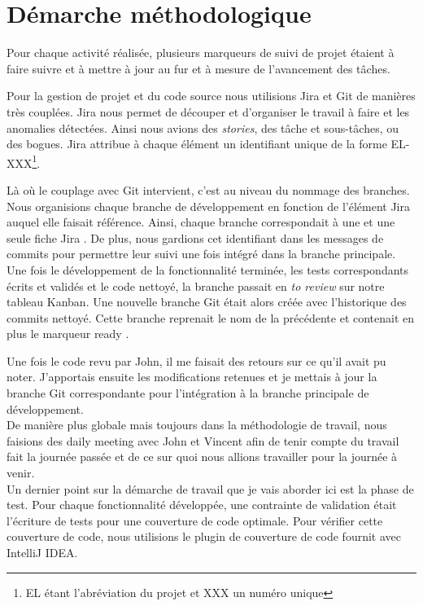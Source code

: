 \section{Démarche méthodologique}
\label{methodo}
Pour chaque activité réalisée, plusieurs marqueurs de suivi de projet étaient à
faire suivre et à mettre à jour au fur et à mesure de l'avancement des tâches.

Pour la gestion de projet et du code source nous utilisions Jira et Git de
manières très couplées. Jira nous permet de découper et d'organiser le travail à
faire et les anomalies détectées. Ainsi nous avions des {\em stories}, des tâche
et sous-tâches, ou des bogues. Jira attribue à chaque élément un identifiant unique
de la forme EL-XXX\footnote{EL étant l'abréviation du projet et XXX un numéro
unique}.

Là où le couplage avec Git intervient, c'est au niveau du nommage des branches.
Nous organisions chaque branche de développement en fonction de l'élément Jira
auquel elle faisait référence. Ainsi, chaque branche correspondait à une et une
seule \og fiche Jira \fg{}. De plus, nous gardions cet identifiant dans les
messages de commits pour permettre leur suivi une fois intégré dans la branche
principale.\\

Une fois le développement de la fonctionnalité terminée, les tests correspondants
écrits et validés et le code nettoyé, la branche passait en {\em \og to review
\fg{} } sur notre tableau Kanban. Une nouvelle branche Git était alors créée
avec l'historique des commits nettoyé. Cette branche reprenait le nom de la
précédente et contenait en plus le marqueur \og ready \fg{}.

Une fois le code revu par John, il me faisait des retours sur ce qu'il avait pu
noter. J'apportais ensuite les modifications retenues et je mettais à jour la
branche Git correspondante pour l'intégration à la branche principale de
développement.\\

De manière plus globale mais toujours dans la méthodologie de travail, nous
faisions des \og daily meeting \fg{} avec John et Vincent afin de tenir compte du
travail fait la journée passée et de ce sur quoi nous allions travailler pour la
journée à venir.\\

Un dernier point sur la démarche de travail que je vais aborder ici est la phase
de test. Pour chaque fonctionnalité développée, une contrainte de validation
était l'écriture de tests pour une couverture de code optimale. Pour vérifier
cette couverture de code, nous utilisions le plugin de couverture de code
fournit avec IntelliJ IDEA.


